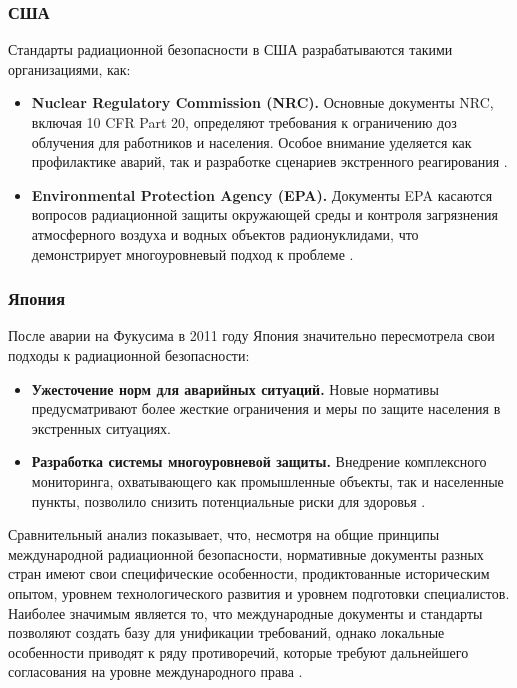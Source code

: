 \documentclass[a4paper, 14pt]{extarticle}
\begin{document}
\subsubsection{США}

Стандарты радиационной безопасности в США разрабатываются такими организациями, как:

\begin{itemize}
    \item \textbf{Nuclear Regulatory Commission (NRC).} Основные документы NRC, включая 10 CFR Part 20, определяют требования к ограничению доз облучения для работников и населения. Особое внимание уделяется как профилактике аварий, так и разработке сценариев экстренного реагирования \cite{11}.

    \item \textbf{Environmental Protection Agency (EPA).} Документы EPA касаются вопросов радиационной защиты окружающей среды и контроля загрязнения атмосферного воздуха и водных объектов радионуклидами, что демонстрирует многоуровневый подход к проблеме \cite{12}.
\end{itemize}

\subsubsection{Япония}

После аварии на Фукусима в 2011 году Япония значительно пересмотрела свои подходы к радиационной безопасности:

\begin{itemize}
    \item \textbf{Ужесточение норм для аварийных ситуаций.} Новые нормативы предусматривают более жесткие ограничения и меры по защите населения в экстренных ситуациях.

    \item \textbf{Разработка системы многоуровневой защиты.} Внедрение комплексного мониторинга, охватывающего как промышленные объекты, так и населенные пункты, позволило снизить потенциальные риски для здоровья \cite{13}.
\end{itemize}

Сравнительный анализ показывает, что, несмотря на общие принципы международной радиационной безопасности, нормативные документы разных стран имеют свои специфические особенности, продиктованные историческим опытом, уровнем технологического развития и уровнем подготовки специалистов. Наиболее значимым является то, что международные документы и стандарты позволяют создать базу для унификации требований, однако локальные особенности приводят к ряду противоречий, которые требуют дальнейшего согласования на уровне международного права \cite{6,11}.
\end{document}
